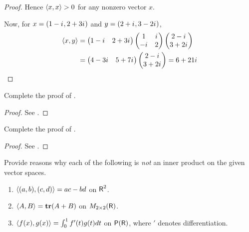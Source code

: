 \begin{proof}
Hence \(\left< x, x \right> > 0\) for any nonzero vector \(x\).

Now, for \(x = (1 - {i\mkern1mu}, 2 + 3{i\mkern1mu})\) and \(y = (2 + {i\mkern1mu}, 3 - 2{i\mkern1mu})\),
\begin{align*}
    \left< x, y \right> &
    = \begin{pmatrix} 1 - {i\mkern1mu} & 2 + 3{i\mkern1mu} \end{pmatrix}
        \begin{pmatrix} 1 & {i\mkern1mu} \\ -{i\mkern1mu} & 2 \end{pmatrix}
        \begin{pmatrix} 2 - {i\mkern1mu} \\ 3 + 2{i\mkern1mu} \end{pmatrix} \\
    & = \begin{pmatrix} 4 - 3{i\mkern1mu} & 5 + 7{i\mkern1mu} \end{pmatrix}
        \begin{pmatrix} 2 - {i\mkern1mu} \\ 3 + 2{i\mkern1mu} \end{pmatrix}
    = 6 + 21{i\mkern1mu}
\end{align*}
\end{proof}

\begin{exercise} \label{exercise 6.1.6}
Complete the proof of .
\end{exercise}

\begin{proof}
See .
\end{proof}

\begin{exercise} \label{exercise 6.1.7}
Complete the proof of .
\end{exercise}

\begin{proof}
See .
\end{proof}

\begin{exercise} \label{exercise 6.1.8}
Provide reasons why each of the following is \emph{not} an inner product on the given vector spaces.
\begin{enumerate}
\item \(\left< (a , b), (c, d) \right> = ac - bd\) on \(\textsf{R}^2\).
\item \(\left< A, B \right> = \textbf{tr}(A + B)\) on \(M_{2 \times 2}(\textsf{R})\).
\item \(\left< f(x), g(x) \right> = \int_0^1 f'(t)g(t) dt\) on \(\textsf{P}(\textsf{R})\), where \('\) denotes differentiation.
\end{enumerate}
\end{exercise}

